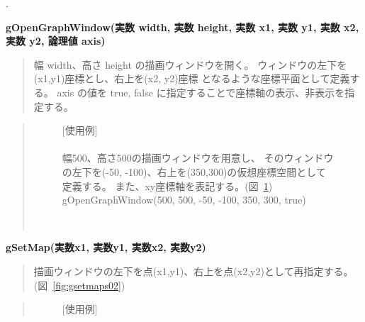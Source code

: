 \documentclass[11pt,a4j]{jarticle}
\newcounter{enum2}
\newenvironment{enumerate2}{%
   \begin{list}%
   {%
      \arabic{enum2}.\ \,%
   }%
   {%
      \usecounter{enum2}
      \setlength{\itemindent}{0zw}%
      \setlength{\leftmargin}{3zw}%
      \setlength{\rightmargin}{0zw}%
      \setlength{\labelsep}{0zw}%
      \setlength{\labelwidth}{3zw}%
      \setlength{\itemsep}{0em}%
      \setlength{\parsep}{0em}%
      \setlength{\listparindent}{0zw}%
   }
}{%
   \end{list}%
}
\begin{document}
\begin{enumerate2}
\item {\bf{gOpenGraphWindow(実数 width, 実数 height, 実数 x1, 実数 y1, 実数 x2, 実数 y2, 論理値 axis)}} \\
\vspace{-5mm}
   \begin{quotation}
   幅 width、高さ height の描画ウィンドウを開く。
   ウィンドウの左下を(x1,y1)座標とし、右上を(x2, y2)座標
   となるような座標平面として定義する。
   axis の値を true, false に指定することで座標軸の表示、非表示を指定する。
   \end{quotation}
   \begin{quotation}
\begin{figure}[!h]
\begin{center}
\begin{minipage}{24zw}
	   \noindent $[$使用例$]$\\
\ \\
幅500、高さ500の描画ウィンドウを用意し、
そのウィンドウの左下を(-50, -100)、右上を(350,300)の仮想座標空間として定義する。
また、xy座標軸を表記する。(図~\ref{fig:gopengraphwindow}) \\

{\small{gOpenGraphWindow(500, 500, -50, -100, 350, 300, true)}}
\end{minipage}
\begin{minipage}{20zw}
\begin{center}
\caption{$\!\!\!\!$\colorbox{white}{{\textcolor{white}{:}}}}
\label{fig:gopengraphwindow}
\end{center}
\end{minipage}
\end{center}
\end{figure}
   \end{quotation}


\item {\bf{gSetMap(実数x1, 実数y1, 実数x2, 実数y2)}} \\
  \begin{quotation}
     描画ウィンドウの左下を点(x1,y1)、右上を点(x2,y2)として再指定する。
     (図~\ref{fig:gsetmaps02})\\
  \end{quotation}
\begin{quotation}
\begin{figure}[!h]
\begin{minipage}{25zw}
\noindent $[$使用例$]$ \\


\end{minipage}
\end{figure}
\end{quotation}
\end{enumerate2}
\end{document}
